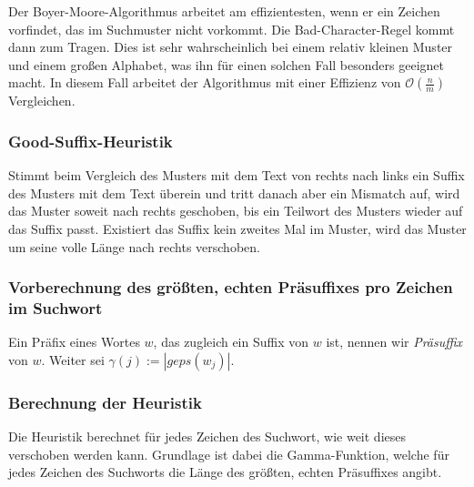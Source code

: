 Der Boyer-Moore-Algorithmus arbeitet am effizientesten, wenn er ein Zeichen vorfindet, das im Suchmuster nicht vorkommt. Die Bad-Character-Regel kommt dann zum Tragen. Dies ist sehr wahrscheinlich bei einem relativ kleinen Muster und einem großen Alphabet, was ihn für einen solchen Fall besonders geeignet macht. In diesem Fall arbeitet der Algorithmus mit einer Effizienz von \(\mathcal{O}(\frac{n}{m})\) Vergleichen.

\subsubsection{Good-Suffix-Heuristik}
Stimmt beim Vergleich des Musters mit dem Text von rechts nach links ein Suffix des Musters mit dem Text überein und tritt danach aber ein Mismatch auf, wird das Muster soweit nach rechts geschoben, bis ein Teilwort des Musters wieder auf das Suffix passt. Existiert das Suffix kein zweites Mal im Muster, wird das Muster um seine volle Länge nach rechts verschoben.

\subsubsection{Vorberechnung des größten, echten Präsuffixes pro Zeichen im Suchwort}
Ein Präfix eines Wortes \(w\), das zugleich ein Suffix von \(w\) ist, nennen wir \textit{Präsuffix} von \(w\). Weiter sei \(\gamma(j) := | geps(w_j)|\).

\subsubsection{Berechnung der Heuristik}
Die Heuristik berechnet für jedes Zeichen des Suchwort, wie weit dieses verschoben werden kann. Grundlage ist dabei die Gamma-Funktion, welche für jedes Zeichen des Suchworts die Länge des größten, echten Präsuffixes angibt.
\text{}\\


